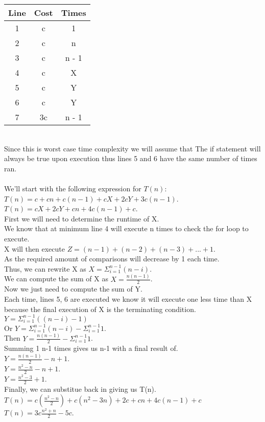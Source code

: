 \documentclass{article}
\begin{document}
\begin{tabular}{|c|c|c|}
    \hline
    Line & Cost & Times\\
    \hline
    1 & c & 1\\
    2 & c & n\\
    3 & c & n - 1\\
    4 & c & X\\
    5 & c & Y\\
    6 & c & Y\\
    7 & 3c & n - 1\\
    \hline
\end{tabular}\\
Since this is worst case time complexity we will assume that 
The if statement will always be true upon execution thus 
lines 5 and 6 have the same number of times ran.\\\\
We'll start with the following expression for $T(n):$\\
$T(n) = c + cn + c(n - 1) + cX + 2cY + 3c(n-1)$.\\
$T(n) = cX + 2cY + cn + 4c(n - 1) + c$.\\
First we will need to determine the runtime of X.\\
We know that at minimum line 4 will execute n times to 
check the for loop to execute.\\
X will then execute $Z = (n - 1) + (n - 2) + (n - 3) + ... + 1$.\\
As the required amount of comparisons will decrease by 1 each time.\\
Thus, we can rewrite X as $X = \Sigma^{n - 1}_{i = 1} (n - i)$.\\
We can compute the sum of X as $X = \frac{n(n - 1)}{2}$.\\
Now we just need to compute the sum of Y.\\
Each time, lines 5, 6 are executed we know it will 
execute one less time than X because the final execution 
of X is the terminating condition.\\
$Y = \Sigma^{n - 1}_{i = 1} ((n - i) - 1)$\\
Or $Y = \Sigma^{n - 1}_{i = 1} (n - i) - \Sigma^{n - 1}_{i = 1} 1$.\\
Then $Y = \frac{n(n - 1)}{2} - \Sigma^{n - 1}_{i = 1} 1$.\\
Summing 1 n-1 times gives us n-1 with a final result of.\\
$Y = \frac{n(n - 1)}{2} - n + 1$.\\
$Y = \frac{n^{2} - n}{2} - n + 1$.\\
$Y = \frac{n^{2} - 3}{2} + 1$.\\
Finally, we can substitue back in giving us T(n).\\
$T(n) = c(\frac{n^{2} - n}{2}) + c(n^{2} - 3n) + 2c + cn + 4c(n - 1) + c$
$T(n) = 3c\frac{n^{2} + n}{2} - 5c$.\\
\end{document}
